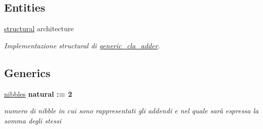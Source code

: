 \subsection*{Entities}
\begin{DoxyCompactItemize}
\item 
\hyperlink{classgeneric__cla__adder_1_1structural}{structural} architecture
\begin{DoxyCompactList}\small\item\em Implementazione structural di \hyperlink{classgeneric__cla__adder}{generic\+\_\+cla\+\_\+adder}. \end{DoxyCompactList}\end{DoxyCompactItemize}
\subsection*{Generics}
 \begin{DoxyCompactItemize}
\item 
\hyperlink{group___carry_loockahead_ga0b63b586531492d0fa882246cca071c1}{nibbles} {\bfseries {\bfseries \textcolor{vhdlchar}{natural}\textcolor{vhdlchar}{ }\textcolor{vhdlchar}{ }\textcolor{vhdlchar}{\+:}\textcolor{vhdlchar}{=}\textcolor{vhdlchar}{ }\textcolor{vhdlchar}{ } \textcolor{vhdldigit}{2} \textcolor{vhdlchar}{ }}}
\begin{DoxyCompactList}\small\item\em numero di nibble in cui sono rappresentati gli addendi e nel quale sarà espressa la somma degli stessi \end{DoxyCompactList}\end{DoxyCompactItemize}
